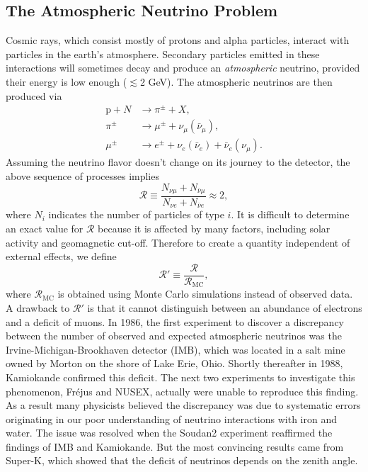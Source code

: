 \subsection{The Atmospheric Neutrino Problem}
Cosmic rays, which consist mostly of protons and alpha particles, interact with
particles in the earth's atmosphere. Secondary particles emitted in these
interactions will sometimes decay and produce an {\it atmospheric} neutrino,
provided their energy is low enough ($\lesssim$2 GeV). The atmospheric neutrinos
are then produced via
\begin{equation}
  \begin{aligned}
    \text{p}+N&\to\pi^\pm+X, \\
    \pi^\pm&\to\mu^\pm+\nu_\mu(\bar{\nu}_\mu), \\
    \mu^\pm&\to e^\pm+\nu_e(\bar{\nu}_e)+\bar{\nu}_e(\nu_\mu).
  \end{aligned}
\end{equation}
Assuming the neutrino flavor doesn't change on its journey to the detector,
the above sequence of processes implies
\begin{equation}
  \mathcal{R}\equiv\frac{N_{\nu\mu}+N_{\bar{\nu}\mu}}
                           {N_{\nu e}+N_{\bar{\nu}e}}\approx2,
\end{equation}
where $N_i$ indicates the number of particles of type $i$.
It is difficult to determine an exact value for $\mathcal{R}$ because it is
affected by many factors, including solar activity and geomagnetic cut-off.
Therefore to create a quantity independent of external effects, we define
\begin{equation}
  \mathcal{R}'\equiv\frac{\mathcal{R}}{\mathcal{R}_\text{MC}},
\end{equation}
where $\mathcal{R}_\text{MC}$ is obtained using Monte Carlo simulations instead
of observed data. A drawback to $\mathcal{R}'$ is that it cannot distinguish
between an abundance of electrons and a deficit of muons.
In 1986, the first experiment to discover a discrepancy between the number of
observed and expected atmospheric neutrinos was the Irvine-Michigan-Brookhaven
detector
(IMB), which was located in a salt mine owned by Morton on the shore of Lake
Erie, Ohio.  Shortly thereafter in 1988, Kamiokande confirmed this deficit.
The next two experiments to investigate this phenomenon, Fr\'ejus and NUSEX,
actually were unable to reproduce this finding. As a result many physicists
believed the discrepancy was due to systematic errors originating in our poor
understanding of neutrino interactions with iron and water. The issue was
resolved when the Soudan2 experiment reaffirmed the findings of IMB and
Kamiokande. But the most convincing results came from Super-K, which showed
that the deficit of neutrinos depends on the zenith angle.

